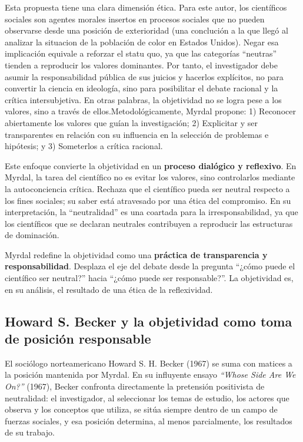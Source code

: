 \documentclass[
  spanish,
  letterpaper,
  DIV=11,
  numbers=noendperiod]{scrreprt}
\begin{document}
Esta propuesta tiene una clara dimensión ética. Para este autor, los
científicos sociales son agentes morales insertos en procesos sociales
que no pueden observarse desde una posición de exterioridad (una
conclución a la que llegó al analizar la situacion de la población de
color en Estados Unidos). Negar esa implicación equivale a reforzar el
statu quo, ya que las categorías ``neutras'' tienden a reproducir los
valores dominantes. Por tanto, el investigador debe asumir la
responsabilidad pública de sus juicios y hacerlos explícitos, no para
convertir la ciencia en ideología, sino para posibilitar el debate
racional y la crítica intersubjetiva. En otras palabras, la objetividad
no se logra pese a los valores, sino a través de
ellos.Metodológicamente, Myrdal propone: 1) Reconocer abiertamente los
valores que guían la investigación; 2) Explicitar y ser transparentes en
relación con su influencia en la selección de problemas e hipótesis; y
3) Someterlos a crítica racional.

Este enfoque convierte la objetividad en un \textbf{proceso dialógico y
reflexivo}. En Myrdal, la tarea del científico no es evitar los valores,
sino controlarlos mediante la autoconciencia crítica. Rechaza que el
científico pueda ser neutral respecto a los fines sociales; su saber
está atravesado por una ética del compromiso. En su interpretación, la
``neutralidad'' es una coartada para la irresponsabilidad, ya que los
científicos que se declaran neutrales contribuyen a reproducir las
estructuras de dominación.

Myrdal redefine la objetividad como una \textbf{práctica de
transparencia y responsabilidad}. Desplaza el eje del debate desde la
pregunta ``¿cómo puede el científico ser neutral?'' hacia ``¿cómo puede
ser responsable?''. La objetividad es, en su análisis, el resultado de
una ética de la reflexividad.

\subsection{Howard S. Becker y la objetividad como toma de posición
responsable}\label{howard-s.-becker-y-la-objetividad-como-toma-de-posiciuxf3n-responsable}

El sociólogo norteamericano Howard S. H. Becker (1967) se suma con
matices a la posición mantenida por Myrdal. En su influyente ensayo
\emph{``Whose Side Are We On?''} (1967), Becker confronta directamente
la pretensión positivista de neutralidad: el investigador, al
seleccionar los temas de estudio, los actores que observa y los
conceptos que utiliza, se sitúa siempre dentro de un campo de fuerzas
sociales, y esa posición determina, al menos parcialmente, los
resultados de su trabajo.
\end{document}
